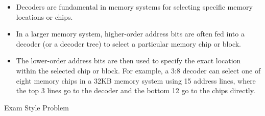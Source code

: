 \documentclass{article}
\begin{document}
\begin{itemize}
        \begin{itemize}
            \item Decoders are fundamental in memory systems for selecting specific memory locations or chips.
            \item In a larger memory system, higher-order address bits are often fed into a decoder (or a decoder tree) to select a particular memory chip or block.
            \item The lower-order address bits are then used to specify the exact location within the selected chip or block. For example, a 3:8 decoder can select one of eight memory chips in a 32KB memory system using 15 address lines, where the top 3 lines go to the decoder and the bottom 12 go to the chips directly.
        \end{itemize}
\end{itemize}

Exam Style Problem
\end{document}
